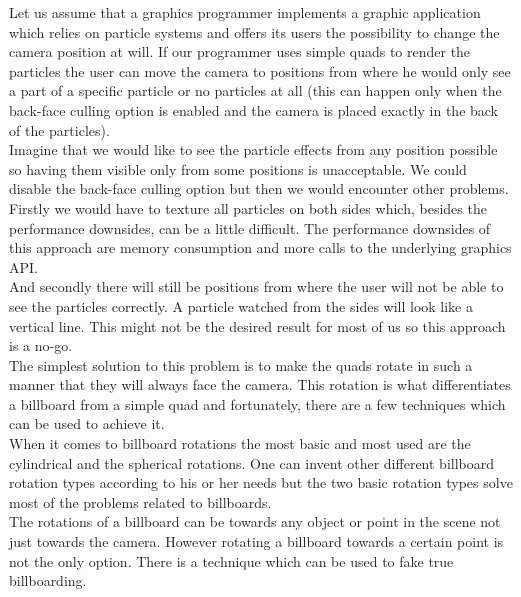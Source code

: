 Let us assume that a graphics programmer implements a graphic application which relies on particle systems and offers its users the possibility to change the camera position at will. If our programmer uses simple quads to render the particles the user can move the camera to positions from where he would only see a part of a specific particle or no particles at all (this can happen only when the back-face culling option is enabled and the camera is placed exactly in the back of the particles).\\

Imagine that we would like to see the particle effects from any position possible so having them visible only from some positions is unacceptable. We could disable the back-face culling option but then we would encounter other problems.\\

Firstly we would have to texture all particles on both sides which, besides the performance downsides, can be a little difficult. The performance downsides of this approach are memory consumption and more calls to the underlying graphics API.\\

And secondly there will still be positions from where the user will not be able to see the particles correctly. A particle watched from the sides will look like a vertical line. This might not be the desired result for most of us so this approach is a no-go.\\

The simplest solution to this problem is to make the quads rotate in such a manner that they will always face the camera. This rotation is what differentiates a billboard from a simple quad and fortunately, there are a few techniques which can be used to achieve it.\\

\newpage
When it comes to billboard rotations the most basic and most used are the cylindrical and the spherical rotations. One can invent other different billboard rotation types according to his or her needs but the two basic rotation types solve most of the problems related to billboards.\\

The rotations of a billboard can be towards any object or point in the scene not just towards the camera. However rotating a billboard towards a certain point is not the only option. There is a technique which can be used to fake true billboarding.\\

